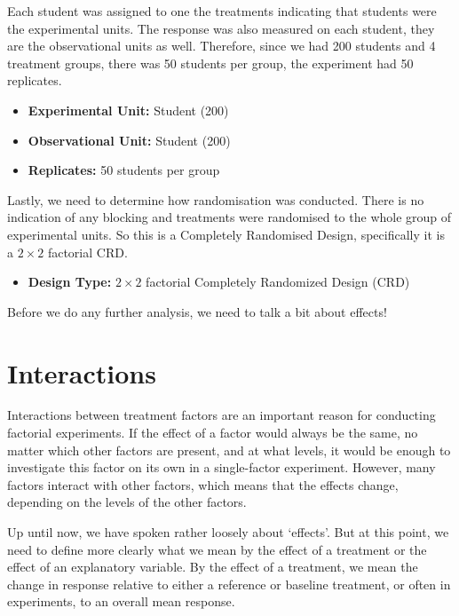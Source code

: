 \documentclass[
  letterpaper,
]{book}
\providecommand{\tightlist}{%
  \setlength{\itemsep}{0pt}\setlength{\parskip}{0pt}}\usepackage{longtable,booktabs,array}
\begin{document}
Each student was assigned to one the treatments indicating that students
were the experimental units. The response was also measured on each
student, they are the observational units as well. Therefore, since we
had 200 students and 4 treatment groups, there was 50 students per
group, the experiment had 50 replicates.

\begin{itemize}
\tightlist
\item
  \textbf{Experimental Unit:} Student (200)\\
\item
  \textbf{Observational Unit:} Student (200)\\
\item
  \textbf{Replicates:} 50 students per group\\
\end{itemize}

Lastly, we need to determine how randomisation was conducted. There is
no indication of any blocking and treatments were randomised to the
whole group of experimental units. So this is a Completely Randomised
Design, specifically it is a \(2\times2\) factorial CRD.

\begin{itemize}
\tightlist
\item
  \textbf{Design Type:} \(2\times2\) factorial Completely Randomized
  Design (CRD)
\end{itemize}

Before we do any further analysis, we need to talk a bit about effects!

\chapter{Interactions}\label{interactions}

Interactions between treatment factors are an important reason for
conducting factorial experiments. If the effect of a factor would always
be the same, no matter which other factors are present, and at what
levels, it would be enough to investigate this factor on its own in a
single-factor experiment. However, many factors interact with other
factors, which means that the effects change, depending on the levels of
the other factors.

Up until now, we have spoken rather loosely about `effects'. But at this
point, we need to define more clearly what we mean by the effect of a
treatment or the effect of an explanatory variable. By the effect of a
treatment, we mean the change in response relative to either a reference
or baseline treatment, or often in experiments, to an overall mean
response.
\end{document}
